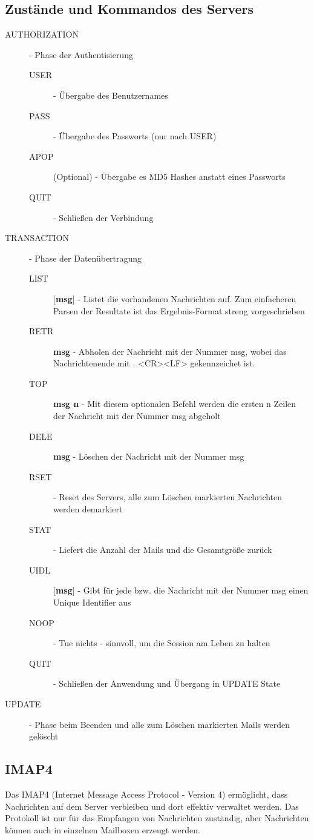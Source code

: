 \documentclass{article} %
\begin{document}
\subsection{Zustände und Kommandos des Servers}
	\begin{description}
	\item[AUTHORIZATION] - Phase der Authentisierung 
		\begin{description}
		\item[USER] - Übergabe des Benutzernames 
		\item[PASS] - Übergabe des Passworts (nur nach USER) 
		\item[APOP](Optional) - Übergabe es MD5 Hashes anstatt eines Passworts
		\item[QUIT] - Schließen der Verbindung 
		\end{description}
	\item[TRANSACTION] - Phase der Datenübertragung 
			\begin{description}
			\item[LIST]\textbf{$[$msg$]$} - Listet die vorhandenen Nachrichten auf. Zum einfacheren Parsen der Resultate ist das Ergebnis-Format streng vorgeschrieben
			\item[RETR]\textbf{msg} - Abholen der Nachricht mit der Nummer msg, wobei das Nachrichtenende mit . <CR><LF> gekennzeichet ist.
			\item[TOP]\textbf{msg n} - Mit diesem optionalen Befehl werden die ersten n Zeilen der Nachricht mit der Nummer msg abgeholt
			\item[DELE]\textbf{msg} - Löschen der Nachricht mit der Nummer msg 
			\item[RSET] - Reset des Servers, alle zum Löschen markierten Nachrichten werden demarkiert 
			\item[STAT] - Liefert die Anzahl der Mails und die Gesamtgröße zurück 
			\item[UIDL]\textbf{$[$msg$]$} - Gibt für jede bzw. die Nachricht mit der Nummer msg einen Unique Identifier aus 
			\item[NOOP] - Tue nichts - sinnvoll, um die Session am Leben zu halten 
			\item[QUIT] - Schließen der Anwendung und Übergang in UPDATE State 
			\end{description}
	\item[UPDATE] - Phase beim Beenden und alle zum Löschen markierten Mails werden gelöscht 
	\end{description}
\subsection{IMAP4}
Das IMAP4\cite{rfc1730} (Internet Message Access Protocol  - Version 4) ermöglicht, dass Nachrichten auf dem Server verbleiben und dort effektiv verwaltet werden. Das Protokoll ist nur für das Empfangen von Nachrichten zuständig, aber Nachrichten können auch in einzelnen Mailboxen erzeugt werden.
\end{document}
